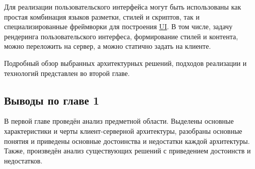 Для реализации пользовательского интерфейса могут быть использованы как простая комбинация языков разметки, стилей и скриптов, так и специализированные фреймворки для построения \hyperlink{gloss:ui}{UI}.
В том числе, задачу рендеринга пользовательского интерфеса, формирование стилей и контента, можно переложить на сервер, а можно статично задать на клиенте. 

Подробный обзор выбранных архитектурных решений, подходов реализации и технологий представлен во второй главе.

\subsection{Выводы по главе 1}\label{subsec:1-conclusion}\indent

В первой главе проведён анализ предметной области.
Выделены основные характеристики и черты клиент-серверной архитектуры, разобраны основные понятия и приведены основные достоинства и недостатки каждой архитектуры.
Также, произведён анализ существующих решений с приведением достоинств и недостатков.
